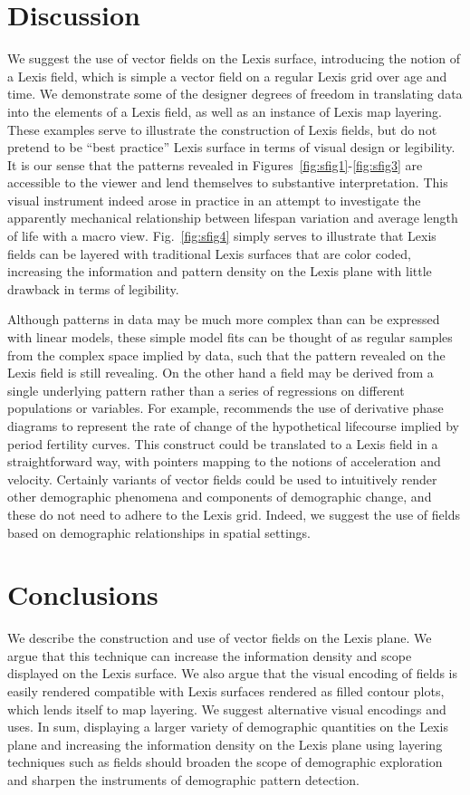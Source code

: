 \documentclass{article}
\begin{document}
\section{Discussion}
We suggest the use of vector fields on the Lexis surface, introducing the notion of a Lexis field, which is simple a vector field on a regular Lexis grid over age and time. We demonstrate some of the designer degrees of freedom in translating data into the elements of a Lexis field, as well as an instance of Lexis map layering. These examples serve to illustrate the construction of Lexis fields, but do not pretend to be ``best practice'' Lexis surface in terms of visual design or legibility. It is our sense that the patterns revealed in Figures~\ref{fig:sfig1}-\ref{fig:sfig3} are accessible to the viewer and lend themselves to substantive interpretation. This visual instrument indeed arose in practice in an attempt to investigate the apparently mechanical relationship between lifespan variation and average length of life with a macro view. Fig.~\ref{fig:sfig4} simply serves to illustrate that Lexis fields can be layered with traditional Lexis surfaces that are color coded, increasing the information and pattern density on the Lexis plane with little drawback in terms of legibility. 

Although patterns in data may be much more complex than can be expressed with linear models, these simple model fits can be thought of as regular samples from the complex space implied by data, such that the pattern revealed on the Lexis field is still revealing. On the other hand a field may be derived from a single underlying pattern rather than a series of regressions on different populations or variables. For example, \citet{shang2018visualizing} recommends the use of derivative phase diagrams to represent the rate of change of the hypothetical lifecourse implied by period fertility curves. This construct could be translated to a Lexis field in a straightforward way, with pointers mapping to the notions of acceleration and velocity. Certainly variants of vector fields could be used to intuitively render other demographic phenomena and components of demographic change, and these do not need to adhere to the Lexis grid. Indeed, we suggest the use of fields based on demographic relationships in spatial settings.

\section{Conclusions}
We describe the construction and use of vector fields on the Lexis plane. We argue that this technique can increase the information density and scope displayed on the Lexis surface. We also argue that the visual encoding of fields is easily rendered compatible with Lexis surfaces rendered as filled contour plots, which lends itself to map layering. We suggest alternative visual encodings and uses. In sum, displaying a larger variety of demographic quantities on the Lexis plane and increasing the information density on the Lexis plane using layering techniques such as fields should broaden the scope of demographic exploration and sharpen the instruments of demographic pattern detection.
\end{document}
